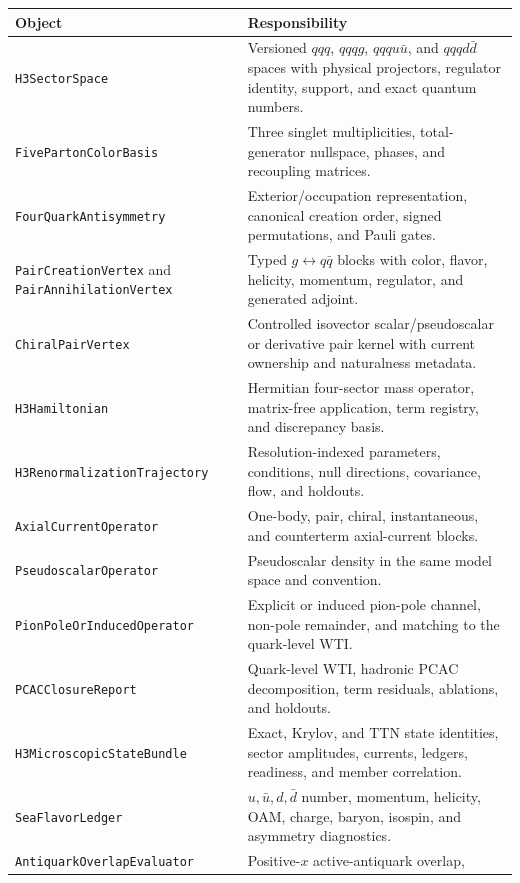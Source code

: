 \documentclass[11pt]{article}
\begin{document}
\begin{longtable}{L{0.29\textwidth}L{0.63\textwidth}}
\toprule
Object & Responsibility\\
\midrule
\endhead
\texttt{H3SectorSpace} & Versioned \(qqq\), \(qqqg\), \(qqqu\bar u\), and
\(qqqd\bar d\) spaces with physical projectors, regulator identity, support,
and exact quantum numbers.\\
\texttt{FivePartonColorBasis} & Three singlet multiplicities, total-generator
nullspace, phases, and recoupling matrices.\\
\texttt{FourQuarkAntisymmetry} & Exterior/occupation representation,
canonical creation order, signed permutations, and Pauli gates.\\
\texttt{PairCreationVertex} and \texttt{PairAnnihilationVertex} & Typed
\(g\leftrightarrow q\bar q\) blocks with color, flavor, helicity, momentum,
regulator, and generated adjoint.\\
\texttt{ChiralPairVertex} & Controlled isovector scalar/pseudoscalar or
derivative pair kernel with current ownership and naturalness metadata.\\
\texttt{H3Hamiltonian} & Hermitian four-sector mass operator, matrix-free
application, term registry, and discrepancy basis.\\
\texttt{H3Renormalization}\newline\texttt{Trajectory} & Resolution-indexed parameters,
conditions, null directions, covariance, flow, and holdouts.\\
\texttt{AxialCurrentOperator} & One-body, pair, chiral, instantaneous, and
counterterm axial-current blocks.\\
\texttt{PseudoscalarOperator} & Pseudoscalar density in the same model space
and convention.\\
\texttt{PionPoleOrInducedOperator} & Explicit or induced pion-pole channel,
non-pole remainder, and matching to the quark-level WTI.\\
\texttt{PCACClosureReport} & Quark-level WTI, hadronic PCAC decomposition,
term residuals, ablations, and holdouts.\\
\texttt{H3MicroscopicStateBundle} & Exact, Krylov, and TTN state identities,
sector amplitudes, currents, ledgers, readiness, and member correlation.\\
\texttt{SeaFlavorLedger} & \(u,\bar u,d,\bar d\) number, momentum, helicity,
OAM, charge, baryon, isospin, and asymmetry diagnostics.\\
\texttt{AntiquarkOverlap}\newline\texttt{Evaluator} & Positive-\(x\) active-antiquark overlap,

\end{longtable}
\end{document}
